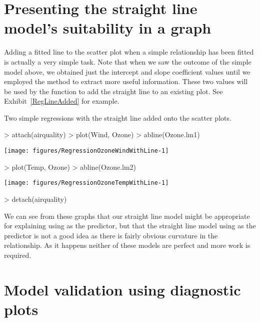 \section{Presenting the straight line model's suitability in a graph}
\label{AddFittedLine}

Adding a fitted line to the scatter plot when a simple relationship has been fitted is actually a very simple task. Note that when we saw the outcome of the simple model above, we obtained just the intercept and slope coefficient values until we employed the  method to extract more useful information. These two values will be used by the  function to add the straight line to an existing plot. See Exhibit~\ref{RegLineAdded} for example.
\begin{exhibit}
\begin{center}
\caption{Two simple regressions with the straight line added onto the scatter plots.}
\label{RegLineAdded}
\begin{Schunk}
\begin{Sinput}
> attach(airquality)
> plot(Wind, Ozone)
> abline(Ozone.lm1)
\end{Sinput}

\texttt{[image: figures/RegressionOzoneWindWithLine-1]} \end{Schunk}
\begin{Schunk}
\begin{Sinput}
> plot(Temp, Ozone)
> abline(Ozone.lm2)
\end{Sinput}

\texttt{[image: figures/RegressionOzoneTempWithLine-1]} \begin{Sinput}
> detach(airquality)
\end{Sinput}
\end{Schunk}
\end{center}
\end{exhibit}

We can see from these graphs that our straight line model might be appropriate for explaining  using  as the predictor, but that the straight line model using  as the predictor is not a good idea as there is fairly obvious curvature in the relationship. As it happens neither of these models are perfect and more work is required.

\section{Model validation using diagnostic plots}
\label{RegValid} 

